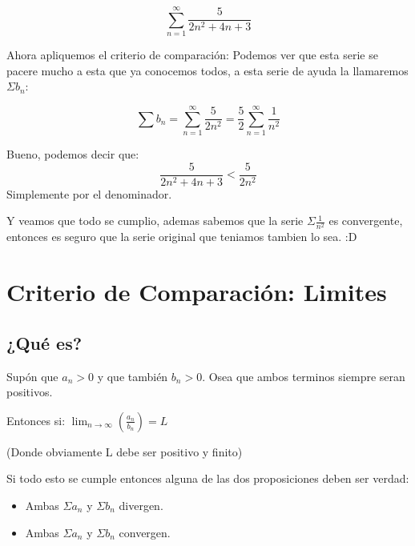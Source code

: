 \documentclass[12pt]{report}							    %
\begin{document}
    \begin{equation*}
        \sum_{n=1}^{\infty} \frac{5}{2n^2 +4n +3}
    \end{equation*}

    Ahora apliquemos el criterio de comparación: Podemos ver que esta serie se pacere mucho a esta
    que ya conocemos todos, a esta serie de ayuda la llamaremos $\Sigma b_n$:

    \begin{equation*}
        \sum b_n = \sum_{n=1}^{\infty} \frac{5}{2n^2} = \frac{5}{2}\sum_{n=1}^{\infty} \frac{1}{n^2}
    \end{equation*}

    Bueno, podemos decir que:
    \begin{equation*}
        \frac{5}{2n^2 +4n +3} < \frac{5}{2n^2}
    \end{equation*}
    Simplemente por el denominador.

    Y veamos que todo se cumplio, ademas sabemos que la serie $\Sigma \frac{1}{n^2}$ es convergente,
    entonces es seguro que la serie original que teniamos tambien lo sea. :D



    \clearpage
    \section{Criterio de Comparación: Limites}


    \subsection{¿Qué es?}
    Supón que $a _n > 0$ y que también $b_n > 0$. Osea que ambos terminos siempre seran positivos.

    Entonces si:
    $\lim_{n \to \infty} \left( \frac{a_n}{b_n} \right) = L$

    (Donde obviamente L debe ser positivo y finito)

    Si todo esto se cumple entonces alguna de las dos proposiciones deben ser verdad:
    \begin{itemize}
        \item Ambas $\Sigma a_n$ y $\Sigma b_n$ divergen.
        \item Ambas $\Sigma a_n$ y $\Sigma b_n$ convergen.
    \end{itemize}
\end{document}
